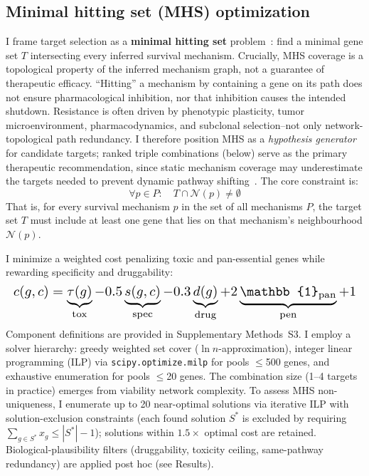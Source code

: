 \documentclass[times, twoside, watermark]{zHenriquesLab-StyleBioRxiv}
\begin{document}
\subsection*{Minimal hitting set (MHS) optimization}
I frame target selection as a \textbf{minimal hitting set} problem~\cite{VeraLicona2013,Murakami2017}: find a minimal gene set $T$ intersecting every inferred survival mechanism. Crucially, MHS coverage is a topological property of the inferred mechanism graph, not a guarantee of therapeutic efficacy. ``Hitting'' a mechanism by containing a gene on its path does not ensure pharmacological inhibition, nor that inhibition causes the intended shutdown. Resistance is often driven by phenotypic plasticity, tumor microenvironment, pharmacodynamics, and subclonal selection--not only network-topological path redundancy. I therefore position MHS as a \emph{hypothesis generator} for candidate targets; ranked triple combinations (below) serve as the primary therapeutic recommendation, since static mechanism coverage may underestimate the targets needed to prevent dynamic pathway shifting~\cite{Liaki2025}. The core constraint is:
\begin{equation}
\forall p \in P: \quad T \cap \mathcal{N}(p) \neq \emptyset
\end{equation}
That is, for every survival mechanism $p$ in the set of all mechanisms $P$, the target set $T$ must include at least one gene that lies on that mechanism's neighbourhood $\mathcal{N}(p)$.

I minimize a weighted cost penalizing toxic and pan-essential genes while rewarding specificity and druggability:
\begin{equation}
\resizebox{\columnwidth}{!}{$\displaystyle
c(g, c) = \underbrace{\tau(g)}_{\text{tox}} - 0.5\underbrace{s(g,c)}_{\text{spec}} - 0.3\underbrace{d(g)}_{\text{drug}} + 2\underbrace{\mathbb{1}_{\text{pan}}}_{\text{pen}} + 1
$}
\end{equation}
Component definitions are provided in Supplementary Methods~S3. I employ a solver hierarchy: greedy weighted set cover ($\ln n$-approximation), integer linear programming (ILP) via \texttt{scipy.optimize.milp} for pools $\leq$500 genes, and exhaustive enumeration for pools $\leq$20 genes. The combination size (1--4 targets in practice) emerges from viability network complexity. To assess MHS non-uniqueness, I enumerate up to 20 near-optimal solutions via iterative ILP with solution-exclusion constraints (each found solution $S^*$ is excluded by requiring $\sum_{g \in S^*} x_g \leq |S^*| - 1$); solutions within $1.5\times$ optimal cost are retained. Biological-plausibility filters (druggability, toxicity ceiling, same-pathway redundancy) are applied post hoc (see Results).
\end{document}
